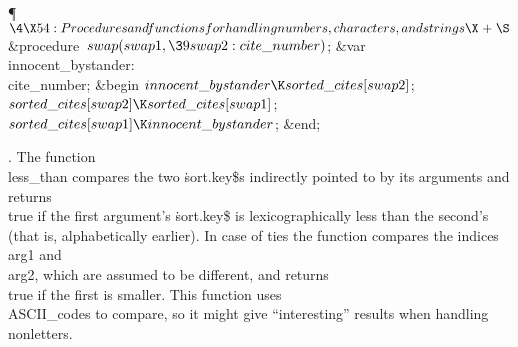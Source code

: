 \Y\P$\4\X54:Procedures and functions for handling numbers, characters, and
strings\X\mathrel{+}\S$\6
\4\&{procedure}\1\  $\\{swap}(\\{swap1},\39\\{swap2}:\\{cite\_number})$;\6
\4\&{var} \\{innocent\_bystander}: \\{cite\_number};\2\6
\&{begin} $\\{innocent\_bystander}\K\\{sorted\_cites}[\\{swap2}]$;\5
$\\{sorted\_cites}[\\{swap2}]\K\\{sorted\_cites}[\\{swap1}]$;\5
$\\{sorted\_cites}[\\{swap1}]\K\\{innocent\_bystander}$;\6
\&{end};\par
\fi

.
The function \\{less\_than} compares the two \.{sort.key\$}s indirectly
pointed to by its arguments and returns \\{true} if the first argument's
\.{sort.key\$} is lexicographically less than the second's (that is,
alphabetically earlier).  In case of ties the function compares the
indices \\{arg1} and \\{arg2}, which are assumed to be different, and
returns \\{true} if the first is smaller.  This function uses
\\{ASCII\_code}s to compare, so it might give ``interesting'' results
when handling nonletters.

